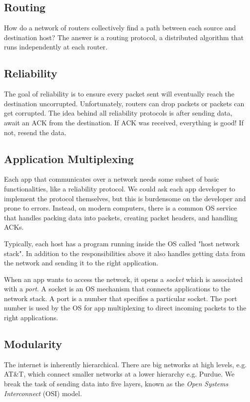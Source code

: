\subsection{Routing}
How do a network of routers collectively find a path between each
source and destination host? The answer is a routing protocol,
a distributed algorithm that runs independently at each router.

\subsection{Reliability}
The goal of reliability is to ensure every packet sent will
eventually reach the destination uncorrupted. Unfortunately,
routers can drop packets or packets can get corrupted. The idea
behind all reliability protocols is after sending data, await an
ACK from the destination. If ACK was received, everything is good!
If not, resend the data.

\subsection{Application Multiplexing}
Each app that communicates over a network needs some subset of
basic functionalities, like a reliability protocol. We could ask
each app developer to implement the protocol themselves, but this
is burdensome on the developer and prone to errors. Instead, on
modern computers, there is a common OS service that handles
packing data into packets, creating packet headers, and handling ACKs.

Typically, each host has a program running inside the OS called
"host network stack". In addition to the responsibilities above it
also handles getting data from the network and sending it to the right
application.

When an app wants to access the network, it opens a \emph{socket} which
is associated with a \emph{port}. A socket is an OS mechanism that connects
applications to the network stack. A port is a number that specifies a
particular socket. The port number is used by the OS for app multiplexing
to direct incoming packets to the right applications.

\subsection{Modularity}
The internet is inherently hierarchical. There are big networks at high levels,
e.g. AT\&T, which connect smaller networks at a lower hierarchy e.g. Purdue.
We break the task of sending data into five layers, known as the
\emph{Open Systems Interconnect} (OSI) model.

